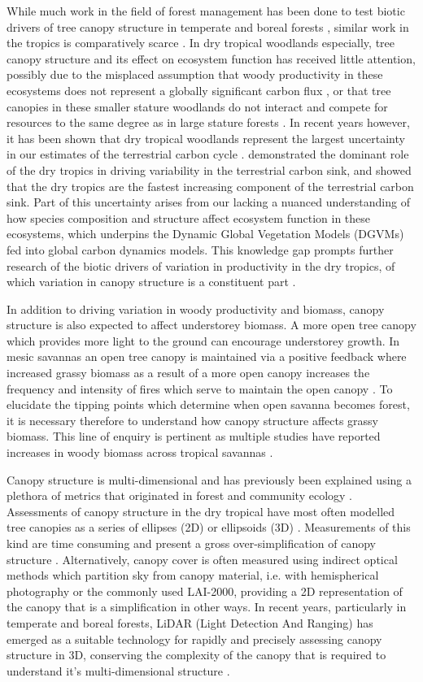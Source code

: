 \documentclass[11pt,a4paper]{article}
\begin{document}
While much work in the field of forest management has been done to test biotic drivers of tree canopy structure in temperate and boreal forests \citep{}, similar work in the tropics is comparatively scarce \citep{}. In dry tropical woodlands especially, tree canopy structure and its effect on ecosystem function has received little attention, possibly due to the misplaced assumption that woody productivity in these ecosystems does not represent a globally significant carbon flux \citep{}, or that tree canopies in these smaller stature woodlands do not interact and compete for resources to the same degree as in large stature forests \citep{}. In recent years however, it has been shown that dry tropical woodlands represent the largest uncertainty in our estimates of the terrestrial carbon cycle \citep{Quere2018, Ahlstrom2015}. \citet{Sitch2015} demonstrated the dominant role of the dry tropics in driving variability in the terrestrial carbon sink, and showed that the dry tropics are the fastest increasing component of the terrestrial carbon sink. Part of this uncertainty arises from our lacking a nuanced understanding of how species composition and structure affect ecosystem function in these ecosystems, which underpins the Dynamic Global Vegetation Models (DGVMs) fed into global carbon dynamics models. This knowledge gap prompts further research of the biotic drivers of variation in productivity in the dry tropics, of which variation in canopy structure is a constituent part \citep{}.

In addition to driving variation in woody productivity and biomass, canopy structure is also expected to affect understorey biomass. A more open tree canopy which provides more light to the ground can encourage understorey growth. In mesic savannas an open tree canopy is maintained via a positive feedback where increased grassy biomass as a result of a more open canopy increases the frequency and intensity of fires which serve to maintain the open canopy \citep{}. To elucidate the tipping points which determine when open savanna becomes forest, it is necessary therefore to understand how canopy structure affects grassy biomass. This line of enquiry is pertinent as multiple studies have reported increases in woody biomass across tropical savannas \citep{}. 

Canopy structure is multi-dimensional and has previously been explained using a plethora of metrics that originated in forest and community ecology \citep{}. Assessments of canopy structure in the dry tropical have most often modelled tree canopies as a series of ellipses (2D) or ellipsoids (3D) \citep{}. Measurements of this kind are time consuming and present a gross over-simplification of canopy structure \citep{}. Alternatively, canopy cover is often measured using indirect optical methods which partition sky from canopy material, i.e. with hemispherical photography or the commonly used LAI-2000, providing a 2D representation of the canopy that is a simplification in other ways. In recent years, particularly in temperate and boreal forests, LiDAR (Light Detection And Ranging) has emerged as a suitable technology for rapidly and precisely assessing canopy structure in 3D, conserving the complexity of the canopy that is required to understand it's multi-dimensional structure \citep{}.
\end{document}
